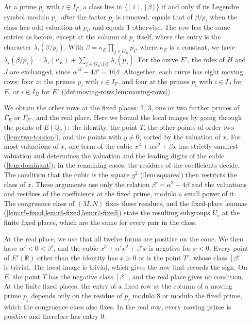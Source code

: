 \documentclass[12pt,oneside,openany]{book}
\theoremstyle{definition}
\theoremstyle{plain}
\numberwithin{equation}{chapter}
\theoremstyle{plain}
\theoremstyle{definition}
\theoremstyle{remark}
\newcommand{\Q}{\mathbb Q}
\newcommand{\R}{\mathbb R}
\newcommand{\sq}[1]{[#1]}
\begin{document}
At a prime $p_i$ with $i\in I_F$, a class lies in $\{\sq1,\sq\beta\}$ if and only if its Legendre symbol modulo $p_i$, after the factor $p_i$ is removed, equals that of $\beta/p_i$ when the class has odd valuation at $p_i$, and equals $1$ otherwise. The row has the same entries as before, except at the column of $p_i$ itself, where the entry is the character $\lambda_i(\beta/p_i)$. With $\beta=\kappa_E\prod_{j\in G_E}p_j$, where $\kappa_E$ is a constant, we have $\lambda_i(\beta/p_i)=\lambda_i(\kappa_E)+\sum_{j\in G_E\setminus\{i\}}\lambda_i(p_j)$. For the curve $E'$, the roles of $H$ and $J$ are exchanged, since $\alpha'^2-4\beta'=16\beta$. Altogether, each curve has eight moving rows: four at the primes $p_i$ with $i\in I_F$, and four at the primes $p_i$ with $i\in I_J$ for $E$, or $i\in I_H$ for $E'$ (\cref{def:moving-rows,lem:moving-rows}).

We obtain the other rows at the fixed places: $2$, $3$, one or two further primes of $\Gamma_E$ or $\Gamma_{E'}$, and the real place. Here we bound the local images by going through the points of $E(\Q_v)$: the identity, the point $T$, the other points of order two (\cref{lem:two-torsion}), and the points with $y\ne0$, sorted by the valuation of $x$. For most valuations of $x$, one term of the cubic $x^3+\alpha x^2+\beta x$ has strictly smallest valuation and determines the valuation and the leading digits of the cubic (\cref{lem:dominant}); in the remaining cases, the residues of the coefficients decide. The condition that the cubic is the square $y^2$ (\cref{lem:squares}) then restricts the class of $x$. These arguments use only the relation $\beta'=\alpha^2-4\beta$ and the valuations and residues of the coefficients at the fixed prime, modulo a small power of it. The congruence class of $(M,N)$ fixes these residues, and the fixed-place lemmas (\cref{lem:r5-fixed,lem:r6-fixed,lem:r7-fixed}) state the resulting subgroups $U_v$ at the finite fixed places, which are the same for every pair in the class.

At the real place, we use that all twelve forms are positive on the cone. We then have $\alpha'<0<\beta'$, and the cubic $x^3+\alpha'x^2+\beta'x$ is negative for $x<0$. Every point of $E'(\R)$ other than the identity has $x>0$ or is the point $T'$, whose class $\sq{\beta'}$ is trivial. The local image is trivial, which gives the row that records the sign. On $E$, the point $T$ has the negative class $\sq\beta$, and the real place gives no condition. At the finite fixed places, the entry of a fixed row at the column of a moving prime $p_j$ depends only on the residue of $p_j$ modulo $8$ or modulo the fixed prime, which the congruence class also fixes. In the real row, every moving prime is positive and therefore has entry $0$.
\end{document}
